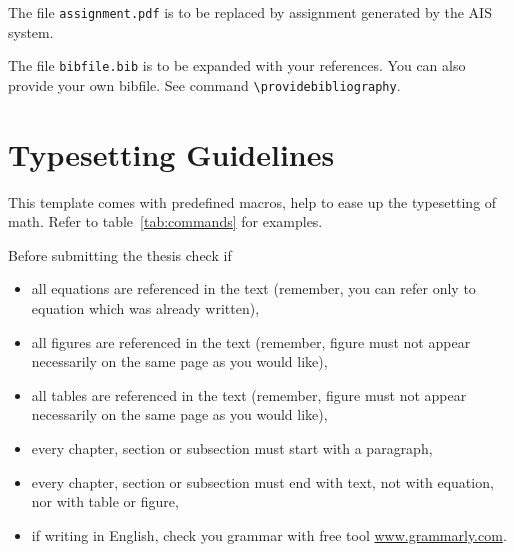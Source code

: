 The file \texttt{assignment.pdf} is to be replaced by assignment generated by 
the AIS system.

The file \texttt{bibfile.bib} is to be expanded with your references. You can 
also provide your own bibfile. See command 
\texttt{\textbackslash{providebibliography}}.

\section{Typesetting Guidelines}
This template comes with predefined macros, help to ease up the typesetting of 
math. Refer to table~\ref{tab:commands} for examples.


Before submitting the thesis check if
\begin{itemize}
	\item all equations are referenced in the text (remember, you can refer only 
	to equation which was already written),
	\item all figures are referenced in the text (remember, figure must not 
	appear necessarily on the same page as you would like),
	\item all tables are referenced in the text (remember, figure must not 
		appear necessarily on the same page as you would like),
	\item every chapter, section or subsection must start with a paragraph,
	\item every chapter, section or subsection must end with text, not with 
	equation, nor with table or figure,
	\item if writing in English, check you grammar with free tool 
	\url{www.grammarly.com}.
\end{itemize}


